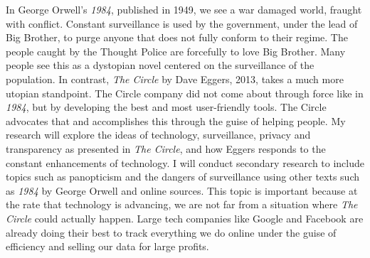In George Orwell's \textit{1984}, published in 1949, we see a war damaged world, fraught with conflict.
Constant surveillance is used by the government, under the lead of Big Brother, to purge anyone that does not fully conform to their regime.
The people caught by the Thought Police are forcefully  to love Big Brother.
Many people see this as a dystopian novel centered on the surveillance of the population.
In contrast, \textit{The Circle} by Dave Eggers, 2013, takes a much more utopian standpoint.
The Circle company did not come about through force like in \textit{1984}, but by developing the best and most user-friendly tools.
The Circle advocates that  and accomplishes this through the guise of helping people.
My research will explore the ideas of technology, surveillance, privacy and transparency as presented in \textit{The Circle}, and how Eggers responds to the constant enhancements of technology.
I will conduct secondary research to include topics such as panopticism and the dangers of surveillance using other texts such as \textit{1984} by George Orwell and online sources.
This topic is important because at the rate that technology is advancing, we are not far from a situation where \textit{The Circle} could actually happen.
Large tech companies like Google and Facebook are already doing their best to track everything we do online under the guise of efficiency and selling our data for large profits.